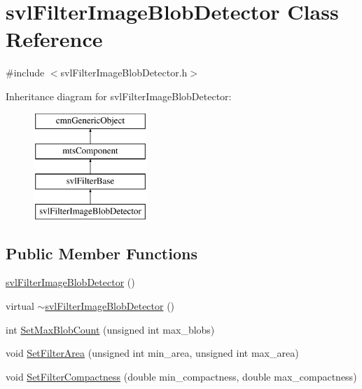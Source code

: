 \hypertarget{classsvl_filter_image_blob_detector}{}\section{svl\+Filter\+Image\+Blob\+Detector Class Reference}
\label{classsvl_filter_image_blob_detector}


{\ttfamily \#include $<$svl\+Filter\+Image\+Blob\+Detector.\+h$>$}

Inheritance diagram for svl\+Filter\+Image\+Blob\+Detector\+:\begin{figure}[H]
\begin{center}
\leavevmode
\includegraphics[height=4.000000cm]{da/d9a/classsvl_filter_image_blob_detector}
\end{center}
\end{figure}
\subsection*{Public Member Functions}
\begin{DoxyCompactItemize}
\item 
\hyperlink{classsvl_filter_image_blob_detector_a5285b6bd173bc28b6d7b7bfe209ae696}{svl\+Filter\+Image\+Blob\+Detector} ()
\item 
virtual \hyperlink{classsvl_filter_image_blob_detector_ade2f14158a8df2f5e5e7be890d4e3340}{$\sim$svl\+Filter\+Image\+Blob\+Detector} ()
\item 
int \hyperlink{classsvl_filter_image_blob_detector_a0d6186ee543acab3892c0f4a7e9837db}{Set\+Max\+Blob\+Count} (unsigned int max\+\_\+blobs)
\item 
void \hyperlink{classsvl_filter_image_blob_detector_ab73c492f8ffacc5aedd6af9428434dc2}{Set\+Filter\+Area} (unsigned int min\+\_\+area, unsigned int max\+\_\+area)
\item 
void \hyperlink{classsvl_filter_image_blob_detector_a496743d5dc86fd454a4d3205bda8d901}{Set\+Filter\+Compactness} (double min\+\_\+compactness, double max\+\_\+compactness)
\end{DoxyCompactItemize}
